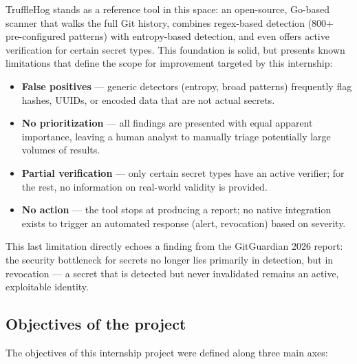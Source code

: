 \documentclass[12pt]{article}
\begin{document}
TruffleHog stands as a reference tool in this space: an open-source, Go-based scanner that walks the full Git history, combines regex-based detection (800+ pre-configured patterns) with entropy-based detection, and even offers active verification for certain secret types. This foundation is solid, but presents known limitations that define the scope for improvement targeted by this internship:

\begin{itemize}
    \item \textbf{False positives} --- generic detectors (entropy, broad patterns) frequently flag hashes, UUIDs, or encoded data that are not actual secrets.
    \item \textbf{No prioritization} --- all findings are presented with equal apparent importance, leaving a human analyst to manually triage potentially large volumes of results.
    \item \textbf{Partial verification} --- only certain secret types have an active verifier; for the rest, no information on real-world validity is provided.
    \item \textbf{No action} --- the tool stops at producing a report; no native integration exists to trigger an automated response (alert, revocation) based on severity.
\end{itemize}

This last limitation directly echoes a finding from the GitGuardian 2026 report: the security bottleneck for secrets no longer lies primarily in detection, but in revocation --- a secret that is detected but never invalidated remains an active, exploitable identity.

\subsection{Objectives of the project}

The objectives of this internship project were defined along three main axes:
\end{document}
